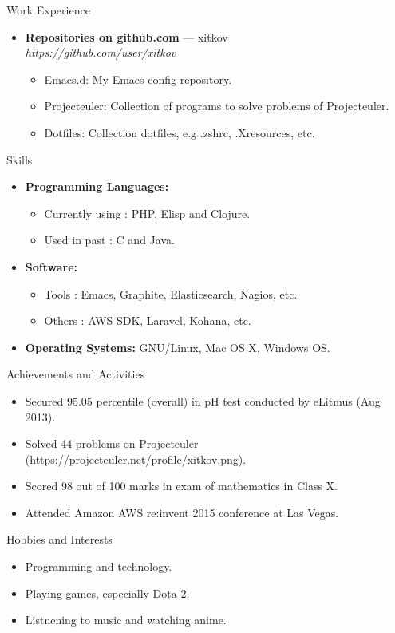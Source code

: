 \documentclass[a4paper,11pt,oneside]{article}
\newenvironment{ressection}[1]{
  \vspace{4pt}
         {\fontfamily{phv}\selectfont\Large#1}
         \begin{itemize}
           \vspace{3pt}
}{
         \end{itemize}
}
\newcommand{\resitem}[1]{
  \vspace{-4pt}
\item \begin{flushleft} #1 \end{flushleft}
}
\newcommand{\ressubitem}[1]{
  \vspace{-1pt}
\item \begin{flushleft} #1 \end{flushleft}
}
\newcommand{\resbigitem}[3]{
  \vspace{-5pt}
\item
  \textbf{#1} --- #2 \\
  \textit{#3}
}
\newenvironment{ressubsec}[3]{
  \resbigitem{#1}{#2}{#3}
  \vspace{-2pt}
  \begin{itemize}
}{
  \end{itemize}
}
\newenvironment{reslist}[1]{
  \resitem{\textbf{#1}}
  \vspace{-5pt}
  \begin{itemize}
}{
  \end{itemize}
}
\begin{document}
\begin{ressection}{Work Experience}
  \begin{ressubsec}{Repositories on github.com}{xitkov}{https://github.com/user/xitkov}
    \ressubitem{Emacs.d: My Emacs config repository.}
    \ressubitem{Projecteuler: Collection of programs to solve problems of Projecteuler.}
    \ressubitem{Dotfiles: Collection dotfiles, e.g .zshrc, .Xresources, etc.}
  \end{ressubsec}
\end{ressection}


\begin{ressection}{Skills}
  \begin{reslist}{Programming Languages:}
    \ressubitem{Currently using : PHP, Elisp and Clojure.}
    \ressubitem{Used in past : C and Java.}
  \end{reslist}
  \begin{reslist}{Software:}
    \ressubitem{Tools : Emacs, Graphite, Elasticsearch, Nagios, etc.}
    \ressubitem{Others : AWS SDK, Laravel, Kohana, etc.}
  \end{reslist}
    \resitem{\textbf{Operating Systems:} GNU/Linux, Mac OS X, Windows OS.}
\end{ressection}


\begin{ressection}{Achievements and Activities}
  \resitem{Secured 95.05 percentile (overall) in pH test conducted by eLitmus (Aug 2013).}
  \resitem{Solved 44 problems on Projecteuler (https://projecteuler.net/profile/xitkov.png).}
  \resitem{Scored 98 out of 100 marks in exam of mathematics in Class X.}
  \resitem{Attended Amazon AWS re:invent 2015 conference at Las Vegas.}
\end{ressection}


\begin{ressection}{Hobbies and Interests}
  \resitem{Programming and technology.}
  \resitem{Playing games, especially Dota 2.}
  \resitem{Listnening to music and watching anime.}
\end{ressection}
\end{document}
